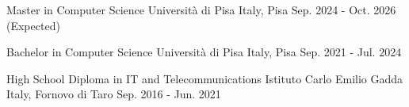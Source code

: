 

\begin{cventries}

  \cventry
    {Master in Computer Science} %
    {Università di Pisa} %
    {Italy, Pisa} %
    {Sep. 2024 - Oct. 2026 (Expected)} %
    {
      \begin{cvitems} %
      \end{cvitems}
    }

  \cventry
  {Bachelor in Computer Science} %
  {Università di Pisa} %
  {Italy, Pisa} %
  {Sep. 2021 - Jul. 2024} %
  {
    \begin{cvitems} %
    \end{cvitems}
  }

  \cventry
  {High School Diploma in IT and Telecommunications} %
  {Istituto Carlo Emilio Gadda} %
  {Italy, Fornovo di Taro} %
  {Sep. 2016 - Jun. 2021} %
  {
    \begin{cvitems} %
    \end{cvitems}
  }

\end{cventries}
